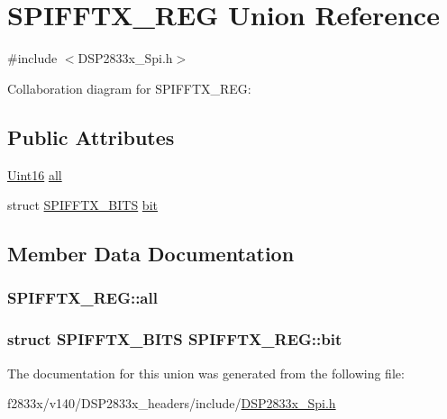 \hypertarget{union_s_p_i_f_f_t_x___r_e_g}{}\section{S\+P\+I\+F\+F\+T\+X\+\_\+\+R\+E\+G Union Reference}
\label{union_s_p_i_f_f_t_x___r_e_g}


{\ttfamily \#include $<$D\+S\+P2833x\+\_\+\+Spi.\+h$>$}



Collaboration diagram for S\+P\+I\+F\+F\+T\+X\+\_\+\+R\+E\+G\+:
\subsection*{Public Attributes}
\begin{DoxyCompactItemize}
\item 
\hyperlink{_d_s_p2833x___device_8h_a59a9f6be4562c327cbfb4f7e8e18f08b}{Uint16} \hyperlink{union_s_p_i_f_f_t_x___r_e_g_a352ab08f847a35cfac44f097becf5405}{all}
\item 
struct \hyperlink{struct_s_p_i_f_f_t_x___b_i_t_s}{S\+P\+I\+F\+F\+T\+X\+\_\+\+B\+I\+T\+S} \hyperlink{union_s_p_i_f_f_t_x___r_e_g_ace66c5930e06b654c5ed3bb27f9971dc}{bit}
\end{DoxyCompactItemize}


\subsection{Member Data Documentation}
\hypertarget{union_s_p_i_f_f_t_x___r_e_g_a352ab08f847a35cfac44f097becf5405}{}
\subsubsection[{all}]{ S\+P\+I\+F\+F\+T\+X\+\_\+\+R\+E\+G\+::all}\label{union_s_p_i_f_f_t_x___r_e_g_a352ab08f847a35cfac44f097becf5405}
\hypertarget{union_s_p_i_f_f_t_x___r_e_g_ace66c5930e06b654c5ed3bb27f9971dc}{}
\subsubsection[{bit}]{\setlength{\rightskip}{0pt plus 5cm}struct {\bf S\+P\+I\+F\+F\+T\+X\+\_\+\+B\+I\+T\+S} S\+P\+I\+F\+F\+T\+X\+\_\+\+R\+E\+G\+::bit}\label{union_s_p_i_f_f_t_x___r_e_g_ace66c5930e06b654c5ed3bb27f9971dc}


The documentation for this union was generated from the following file\+:\begin{DoxyCompactItemize}
\item 
f2833x/v140/\+D\+S\+P2833x\+\_\+headers/include/\hyperlink{_d_s_p2833x___spi_8h}{D\+S\+P2833x\+\_\+\+Spi.\+h}\end{DoxyCompactItemize}
